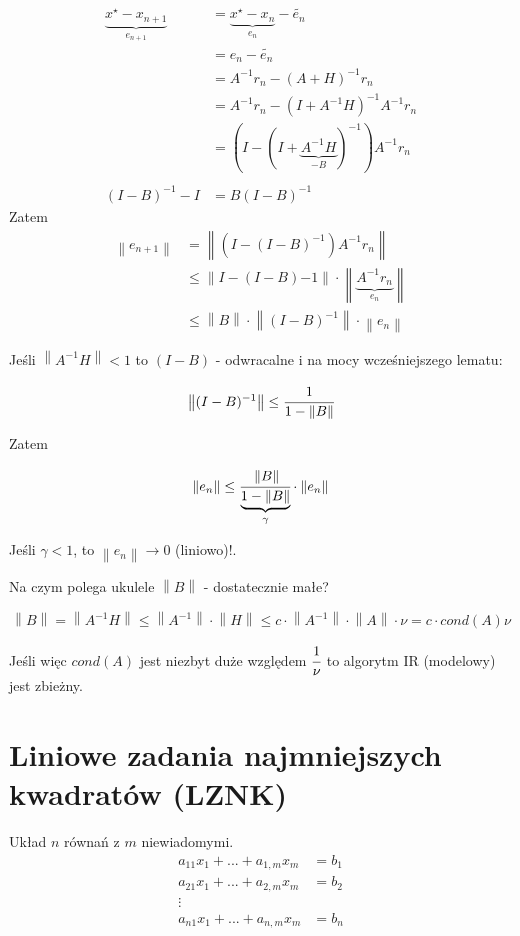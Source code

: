 \documentclass[hidelinks,a4paper]{article}
\newcommand{\ra}{\rightarrow}
\newcommand{\norm}[1]{\left\lVert#1\right\rVert}
\begin{document}
\begin{align*}
	\underbrace{x^\star - x_{n+1}}_{e_{n+1}} & = \underbrace{x^\star - x_n}_{e_n} - \tilde{e_n} \\
	& = e_n - \tilde{e_n} \\
	& = A^{-1}r_n  - (A+H)^{-1}r_n \\
	& = A^{-1}r_n - (I + A^{-1}H)^{-1}A^{-1}r_n \\
	& = (I - (I + \underbrace{A^{-1}H}_{-B})^{-1})A^{-1}r_n \\ \\
	(I - B)^{-1} - I & = B(I - B)^{-1}
\end{align*}
Zatem
\begin{align*}
	\norm{e_{n+1}} & = \norm{(I - (I - B)^{-1})A^{-1} r_n} \\
	& \leq \norm{I - (I - B){-1}} \cdot \norm{\underbrace{A^{-1} r_n}_{e_n}} \\
	& \leq \norm{B} \cdot \norm{(I - B)^{-1}} \cdot \norm{e_n}
\end{align*}

Jeśli $\norm{A^{-1}H} < 1$ to $(I - B)$ - odwracalne i na mocy wcześniejszego lematu:

\[
	\norm{(I - B)^{-1}} \leq \cfrac{1}{1 - \norm{B}}
\]

Zatem

\[
	\norm{e_n} \leq \cfrac{\norm{B}}{\underbrace{1 - \norm{B}}_{\gamma}} \cdot \norm{e_n}
\]

Jeśli $\gamma < 1$, to $\norm{e_n} \ra 0$ (liniowo)!.

Na czym polega ukulele $\norm{B}$ - dostatecznie małe?

\[
	\norm{B} = \norm{A^{-1} H} \leq \norm{A^{-1}} \cdot \norm{H} \leq c \cdot \norm{A^{-1}} \cdot \norm{A} \cdot \nu = c \cdot cond(A) \nu
\]

Jeśli więc $cond(A)$ jest niezbyt duże względem $\cfrac{1}{\nu}$ to algorytm IR (modelowy) jest zbieżny.

\section{Liniowe zadania najmniejszych kwadratów (LZNK)}

Układ $n$ równań z $m$ niewiadomymi.
\begin{align*}
	a_{11}x_{1} + ... + a_{1, m}x_m & = b_1 \\
	a_{21}x_{1} + ... + a_{2, m}x_m & = b_2 \\
	\vdots & \\
	a_{n1}x_{1} + ... + a_{n, m}x_m & = b_n
\end{align*}
\end{document}
